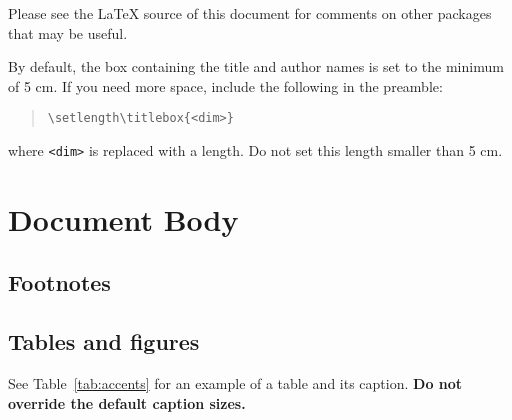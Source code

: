 \documentclass[11pt]{article}
\begin{document}
Please see the \LaTeX{} source of this document for comments on other packages that may be useful.


By default, the box containing the title and author names is set to the minimum of 5 cm. If you need more space, include the following in the preamble:
\begin{quote}
\begin{verbatim}
\setlength\titlebox{<dim>}
\end{verbatim}
\end{quote}
where \verb|<dim>| is replaced with a length. Do not set this length smaller than 5 cm.

\section{Document Body}

\subsection{Footnotes}


\subsection{Tables and figures}

See Table~\ref{tab:accents} for an example of a table and its caption.
\textbf{Do not override the default caption sizes.}
\end{document}
